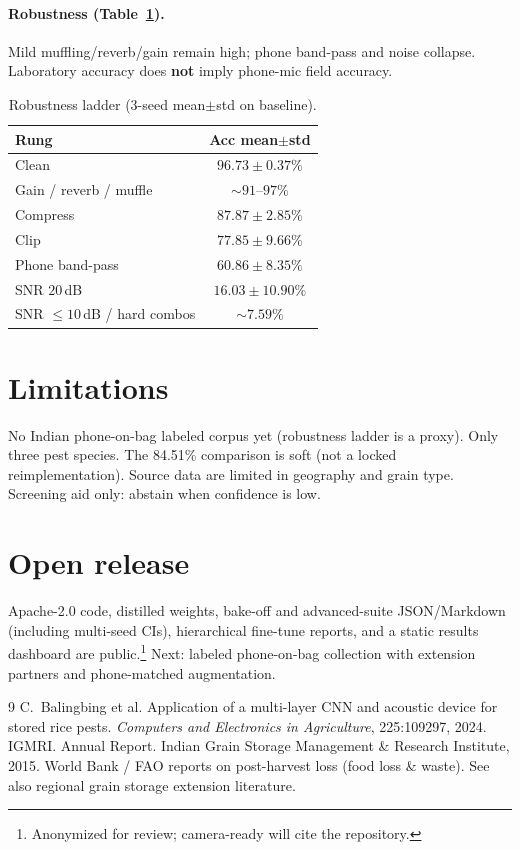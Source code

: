 \documentclass{article}
\begin{document}
\paragraph{Robustness (Table~\ref{tab:robust}).}
Mild muffling/reverb/gain remain high; phone band-pass and noise collapse.
Laboratory accuracy does \textbf{not} imply phone-mic field accuracy.

\begin{table}[t]
\centering
\caption{Robustness ladder (3-seed mean$\pm$std on baseline).}
\label{tab:robust}
\small
\begin{tabular}{lc}
\toprule
Rung & Acc mean$\pm$std \\
\midrule
Clean & $96.73\pm0.37\%$ \\
Gain / reverb / muffle & $\sim91$--$97\%$ \\
Compress & $87.87\pm2.85\%$ \\
Clip & $77.85\pm9.66\%$ \\
Phone band-pass & $60.86\pm8.35\%$ \\
SNR $20$\,dB & $16.03\pm10.90\%$ \\
SNR $\le10$\,dB / hard combos & $\sim7.59\%$ \\
\bottomrule
\end{tabular}
\end{table}

\section{Limitations}
No Indian phone-on-bag labeled corpus yet (robustness ladder is a proxy).
Only three pest species.
The 84.51\% comparison is soft (not a locked reimplementation).
Source data are limited in geography and grain type.
Screening aid only: abstain when confidence is low.

\section{Open release}
Apache-2.0 code, distilled weights, bake-off and advanced-suite JSON/Markdown (including multi-seed CIs), hierarchical fine-tune reports, and a static results dashboard are public.\footnote{Anonymized for review; camera-ready will cite the repository.}
Next: labeled phone-on-bag collection with extension partners and phone-matched augmentation.

\begin{thebibliography}{9}
C.~Balingbing et al.
\newblock Application of a multi-layer CNN and acoustic device for stored rice pests.
\newblock \emph{Computers and Electronics in Agriculture}, 225:109297, 2024.
IGMRI.
\newblock Annual Report.
\newblock Indian Grain Storage Management \& Research Institute, 2015.
World Bank / FAO reports on post-harvest loss (food loss \& waste).
\newblock See also regional grain storage extension literature.
\end{thebibliography}
\end{document}
